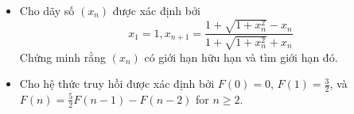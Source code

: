 \documentclass[11pt]{scrartcl}
\begin{document}
\begin{itemize}[label=, leftmargin=0em, itemsep=-0em]

    \item \begin{btvn}
        Cho dãy số $(x_n)$ được xác định bởi $$x_1 = 1, x_{n + 1} = \frac{1 + \sqrt{1 + x_n^2} - x_n}{1 + \sqrt{ 1 + x_n^2} + x_n}$$Chứng minh rằng $(x_n)$ có giới hạn hữu hạn và tìm giới hạn đó.
    \end{btvn}

    \item \begin{btvn}
    Cho hệ thức truy hồi được xác định bởi $F(0)=0$, $F(1)=\frac32$, và $F(n)=\frac{5}{2}F(n-1)-F(n-2)$
    for $n\ge2$.
    

\end{btvn}
\end{itemize}
\end{document}
